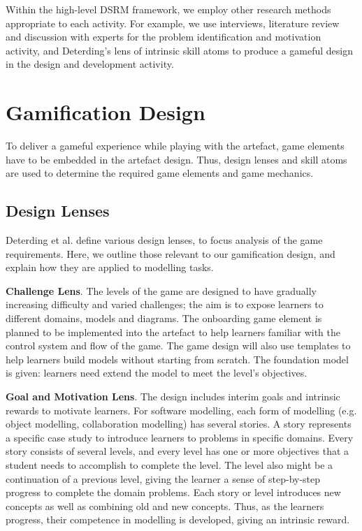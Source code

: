 \documentclass[runningheads,a4paper]{llncs}
\begin{document}
Within the high-level DSRM framework, we  employ other research methods appropriate to each activity. For example, we use interviews, literature review and discussion with experts for the problem identification and motivation activity, and Deterding's lens of intrinsic skill atoms \cite{deterding2015lens} to produce a gameful design in the design and development activity.

\section{Gamification Design}
To deliver a gameful experience while playing with the artefact, game elements have to be embedded in the artefact design. Thus, design lenses and skill atoms \cite{deterding2015lens} are used to determine the required game elements and game mechanics. 

\subsection{Design Lenses}
Deterding et al.  \cite{deterding2015lens} define various design lenses, to focus analysis of the game requirements.  Here, we outline those relevant to our gamification design, and explain how they are applied to  modelling tasks.

\textbf{Challenge Lens}. The levels of the game are designed to have gradually increasing difficulty and varied challenges; the aim is to expose learners to different domains, models and diagrams. The onboarding game element is planned to be implemented into the artefact to help learners familiar with the control system and  flow of the game. The game design will also use templates to help learners build models without starting from scratch. The foundation model is  given: learners  need extend the model to meet the level's objectives.

\textbf{Goal and Motivation Lens}. The design includes interim goals and intrinsic rewards to motivate learners. For software modelling, each form of modelling (e.g. object modelling, collaboration modelling) has several stories. A story represents a specific case study to introduce learners to  problems in specific domains. Every story consists of several levels, and every level has one or more objectives that a student needs to accomplish to complete the level. The level also might be a continuation of a previous level, giving the learner a sense of step-by-step progress to complete the domain problems. Each story or level introduces new concepts as well as combining old and new concepts. Thus, as the learners progress, their competence in modelling is  developed, giving an intrinsic reward. 
\end{document}
